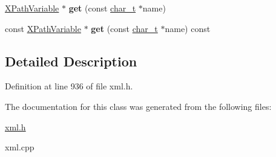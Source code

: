 \begin{DoxyCompactItemize}
\item 
\hypertarget{classphys_1_1xml_1_1XPathVariableSet_a6c7429a3e50c1980a7fcdcee8af66834}{
\hyperlink{classphys_1_1xml_1_1XPathVariable}{XPathVariable} $\ast$ {\bfseries get} (const \hyperlink{namespacephys_1_1xml_afc87705cd1c2917d87b879715a2d8f6e}{char\_\-t} $\ast$name)}
\label{df/dd1/classphys_1_1xml_1_1XPathVariableSet_a6c7429a3e50c1980a7fcdcee8af66834}

\item 
\hypertarget{classphys_1_1xml_1_1XPathVariableSet_a3990eb85bebe88a7d4892eac19d4aa1b}{
const \hyperlink{classphys_1_1xml_1_1XPathVariable}{XPathVariable} $\ast$ {\bfseries get} (const \hyperlink{namespacephys_1_1xml_afc87705cd1c2917d87b879715a2d8f6e}{char\_\-t} $\ast$name) const }
\label{df/dd1/classphys_1_1xml_1_1XPathVariableSet_a3990eb85bebe88a7d4892eac19d4aa1b}

\end{DoxyCompactItemize}


\subsection{Detailed Description}


Definition at line 936 of file xml.h.



The documentation for this class was generated from the following files:\begin{DoxyCompactItemize}
\item 
\hyperlink{xml_8h}{xml.h}\item 
xml.cpp\end{DoxyCompactItemize}
